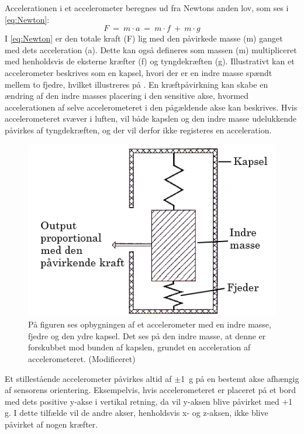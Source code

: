 Accelerationen i et accelerometer beregnes ud fra Newtons anden lov, som ses i \eqref{eq:Newton}:
\begin{equation}\label{eq:Newton}
F~=~m \cdot a~=~m \cdot f~+~m \cdot g
\end{equation} 
I \eqref{eq:Newton} er den totale kraft (F) lig med den påvirkede masse (m) ganget med dets acceleration (a). Dette kan også defineres som massen (m) multipliceret med henholdsvis de eksterne kræfter (f) og tyngdekræften (g). \citep{TittertonWeston2004,Academic2016d} \newline
Illustrativt kan et accelerometer beskrives som en kapsel, hvori der er en indre masse spændt mellem to fjedre, hvilket illustreres på . En kræftpåvirkning kan skabe en ændring af den indre masses placering i den sensitive akse, hvormed accelerationen af selve accelerometeret i den pågældende akse kan beskrives. Hvis accelerometeret svæver i luften, vil både kapslen og den indre masse udelukkende påvirkes af tyngdekræften, og der vil derfor ikke registeres en acceleration.\citep{TittertonWeston2004,Academic2016d}
\begin{figure}[H]
	\centering
	\includegraphics[scale=0.4]{figures/bProblemloesning/accelerometer_basic.png}
	\caption{På figuren ses opbygningen af et accelerometer med en indre masse, fjedre og den ydre kapsel. Det ses på den indre masse, at denne er forskubbet mod bunden af kapslen, grundet en acceleration af accelerometeret. \citep{TittertonWeston2004} (Modificeret)}
	\label{acc_simpelt}
\end{figure}\vspace{-.25cm}
Et stillestående accelerometer påvirkes altid af $\pm$1~g på en bestemt akse afhængig af sensorens orientering. Eksempelvis, hvis accelerometeret er placeret på et bord med dets positive y-akse i vertikal retning, da vil y-aksen blive påvirket med +1 g. I dette tilfælde vil de andre akser, henholdsvis x- og z-aksen, ikke blive påvirket af nogen kræfter. \citep{Serway2010}

